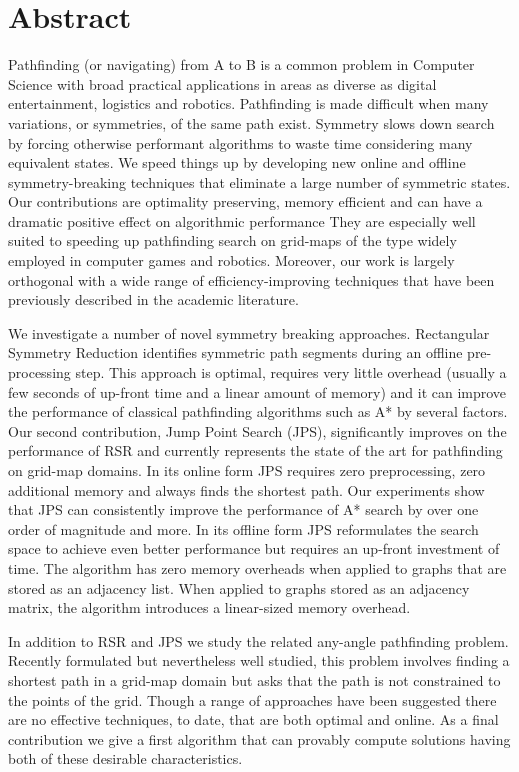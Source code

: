 \chapter*{Abstract}
\vspace{-1em}
Pathfinding (or navigating) from A to B is a common problem in Computer
Science with broad practical applications in areas as diverse as digital
entertainment, logistics and robotics. Pathfinding is made difficult when
many variations, or symmetries, of the same path exist.  Symmetry slows down
search by forcing otherwise performant algorithms to waste time considering
many equivalent states.  We speed things up by developing new online and
offline symmetry-breaking techniques that eliminate a large number of
symmetric states.  Our contributions are optimality preserving, memory
efficient and can have a dramatic positive effect on algorithmic performance 
They are especially well suited to speeding up pathfinding search on grid-maps 
of the type widely employed in computer games and robotics.
Moreover, our work is largely orthogonal with a wide range of
efficiency-improving techniques that have been previously described in the
academic literature.
\par 
We investigate a number of novel symmetry breaking approaches.
Rectangular Symmetry Reduction identifies symmetric path segments during an 
offline pre-processing step.
This approach is optimal, requires very little overhead (usually a few seconds of
up-front time and a linear amount of memory) and it can improve
the performance of classical pathfinding algorithms such as A{*} by several factors.
Our second contribution, Jump Point
Search (JPS), significantly improves on the performance of RSR and currently 
represents the state of the art for pathfinding on grid-map domains.
In its online form JPS requires zero preprocessing, zero additional memory and
always finds the shortest path. Our experiments show that JPS can consistently
improve the performance of A{*} search by over one order of magnitude and more.
In its offline form JPS reformulates the search space to achieve even better
performance but requires an up-front investment of time. The algorithm has
zero memory overheads when applied to graphs that are stored as an adjacency list.
When applied to graphs stored as an adjacency matrix, the algorithm introduces
a linear-sized memory overhead. 
\par
In addition to RSR and JPS we study the related any-angle pathfinding problem.
Recently formulated but nevertheless well studied, this problem involves
finding a shortest path in a grid-map domain but asks that the path is not
constrained to the points of the grid.  Though a range of approaches have been
suggested there are no effective techniques, to date, that are both optimal
and online.  As a final contribution we give a first algorithm that can
provably compute solutions having both of these desirable characteristics.
